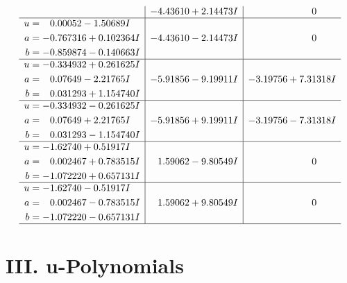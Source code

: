 \documentclass[1p]{elsarticle_modified}
\theoremstyle{definition}
\begin{document}
$$\begin{array}{c|c|c}
 & -4.43610 + 2.14473 I & \phantom{-0.000000 } 0 \\ \hline\begin{aligned}
u &= \phantom{-}0.00052 - 1.50689 I \\
a &= -0.767316 + 0.102364 I \\
b &= -0.859874 - 0.140663 I\end{aligned}
 & -4.43610 - 2.14473 I & \phantom{-0.000000 } 0 \\ \hline\begin{aligned}
u &= -0.334932 + 0.261625 I \\
a &= \phantom{-}0.07649 - 2.21765 I \\
b &= \phantom{-}0.031293 + 1.154740 I\end{aligned}
 & -5.91856 - 9.19911 I & -3.19756 + 7.31318 I \\ \hline\begin{aligned}
u &= -0.334932 - 0.261625 I \\
a &= \phantom{-}0.07649 + 2.21765 I \\
b &= \phantom{-}0.031293 - 1.154740 I\end{aligned}
 & -5.91856 + 9.19911 I & -3.19756 - 7.31318 I \\ \hline\begin{aligned}
u &= -1.62740 + 0.51917 I \\
a &= \phantom{-}0.002467 + 0.783515 I \\
b &= -1.072220 + 0.657131 I\end{aligned}
 & \phantom{-}1.59062 - 9.80549 I & \phantom{-0.000000 } 0 \\ \hline\begin{aligned}
u &= -1.62740 - 0.51917 I \\
a &= \phantom{-}0.002467 - 0.783515 I \\
b &= -1.072220 - 0.657131 I\end{aligned}
 & \phantom{-}1.59062 + 9.80549 I & \phantom{-0.000000 } 0\\
 \hline 
 \end{array}$$\newpage
\newpage\renewcommand{\arraystretch}{1}
\centering \section*{ III. u-Polynomials}
\end{document}
